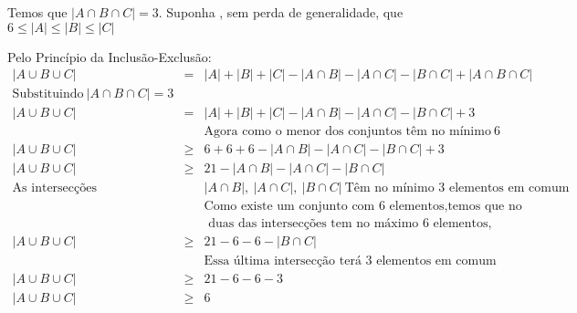 Temos que $|A\cap B\cap C|=3$. Suponha , sem perda de generalidade, que $6\leq |A|\leq|B|\leq|C|$

Pelo Princípio da Inclusão-Exclusão:
\begin{eqnarray*}
		|A\cup B\cup C| &= & |A|+|B|+|C| -|A\cap B|-|A\cap C| - |B\cap C| + |A\cap B\cap C| \\
		\text{Substituindo}\ |A\cap B\cap C|=3\\
		|A\cup B\cup C| &= & |A|+|B|+|C| -|A\cap B|-|A\cap C| - |B\cap C| + 3 \\
						&&\text{Agora como o menor dos conjuntos têm no mínimo}\ 6\\
		|A\cup B\cup C| & \geq & 6+6+6 -|A\cap B|-|A\cap C| - |B\cap C| + 3 \\
		|A\cup B\cup C| & \geq & 21 -|A\cap B|-|A\cap C| - |B\cap C|  \\
		\text{As intersecções}\ &  & |A\cap B|,\ |A\cap C|,\ |B\cap C|\ \text{Têm no mínimo 3 elementos em comum}  \\
								&& \text{Como existe um conjunto com 6 elementos,temos que no máximo}\\
								&& \text{ duas das intersecções tem no máximo 6 elementos, digamos}\\
		|A\cup B\cup C| & \geq & 21 -6-6 - |B\cap C|  \\
						&& \text{Essa última intersecção terá 3 elementos em comum}\\
		|A\cup B\cup C| & \geq & 21 -6-6 - 3  \\
		|A\cup B\cup C| & \geq & 6
\end{eqnarray*}
